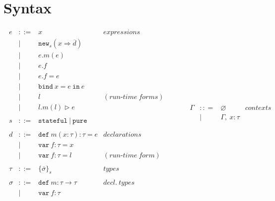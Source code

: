 \documentclass{llncs}
\newcommand{\keywadj}[1]{\mathtt{#1}}
\newcommand{\keyw}[1]{\keywadj{#1}~}
\begin{document}
\section{Syntax}

\[
\begin{array}{lll}
\begin{array}{lllr}
e & ::= & x & expressions \\
& | & \keywadj{new}_{s}(x \Rightarrow \overline{d}) \\
& | & e.m(e)\\
& | & e.f \\
& | & e.f = e \\
& | & \keyw{bind} x = e~\keyw{in} e \\
& | & l & (run\mbox{-}time~forms)\\
& | & l.m(l) \rhd e \\
&&\\
s & ::= & \keyw{stateful} | ~\keyw{pure} \\
&&\\
d & ::= & \keyw{def} m(x:\tau):\tau = e & declarations \\
  & |   & \keyw{var} f:\tau = x \\
  & |   & \keyw{var} f:\tau = l & (run\mbox{-}time~form)\\
&&\\
\tau & ::= & \{ \overline{\sigma} \}_{s} & types \\
&&\\
\sigma & ::= & \keyw{def} m:\tau \rightarrow \tau & decl.~ types \\
       & |   & \keyw{var} f:\tau \\
&&\\
\end{array}
& ~~~~~~
&
\begin{array}{lllr}
\Gamma & :: = & \varnothing & contexts\\
& | & \Gamma,~x : \tau\\
&&\\

\end{array}
\end{array}\]
\end{document}
